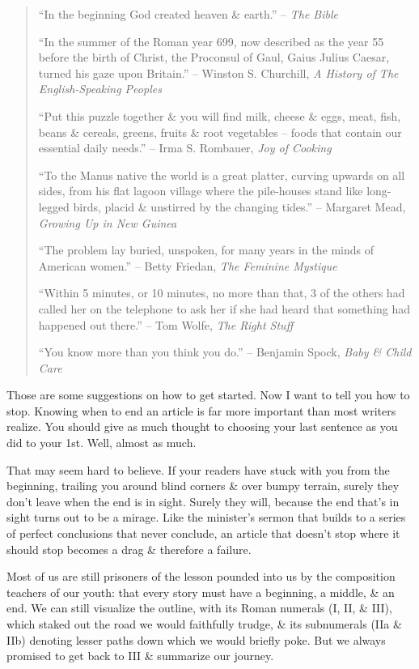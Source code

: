 \documentclass{article}
\begin{document}
\begin{quotation}
	``In the beginning God created heaven \& earth.'' -- \textit{The Bible}
	
	``In the summer of the Roman year 699, now described as the year 55 before the birth of Christ, the Proconsul of Gaul, Gaius Julius Caesar, turned his gaze upon Britain.'' -- Winston S. Churchill, \textit{A History of The English-Speaking Peoples}
	
	``Put this puzzle together \& you will find milk, cheese \& eggs, meat, fish, beans \& cereals, greens, fruits \& root vegetables -- foods that contain our essential daily needs.'' -- Irma S. Rombauer, \textit{Joy of Cooking}
	
	``To the Manus native the world is a great platter, curving upwards on all sides, from his flat lagoon village where the pile-houses stand like long-legged birds, placid \& unstirred by the changing tides.'' -- Margaret Mead, \textit{Growing Up in New Guinea}
	
	``The problem lay buried, unspoken, for many years in the minds of American women.'' -- Betty Friedan, \textit{The Feminine Mystique}
	
	``Within 5 minutes, or 10 minutes, no more than that, 3 of the others had called her on the telephone to ask her if she had heard that something had happened out there.'' -- Tom Wolfe, \textit{The Right Stuff}
	
	``You know more than you think you do.'' -- Benjamin Spock, \textit{Baby \& Child Care}
\end{quotation}
Those are some suggestions on how to get started. Now I want to tell you how to stop. Knowing when to end an article is far more important than most writers realize. You should give as much thought to choosing your last sentence as you did to your 1st. Well, almost as much.

That may seem hard to believe. If your readers have stuck with you from the beginning, trailing you around blind corners \& over bumpy terrain, surely they don't leave when the end is in sight. Surely they will, because the end that's in sight turns out to be a mirage. Like the minister's sermon that builds to a series of perfect conclusions that never conclude, an article that doesn't stop where it should stop becomes a drag \& therefore a failure.

Most of us are still prisoners of the lesson pounded into us by the composition teachers of our youth: that every story must have a beginning, a middle, \& an end. We can still visualize the outline, with its Roman numerals (I, II, \& III), which staked out the road we would faithfully trudge, \& its subnumerals (IIa \& IIb) denoting lesser paths down which we would briefly poke. But we always promised to get back to III \& summarize our journey.
\end{document}
